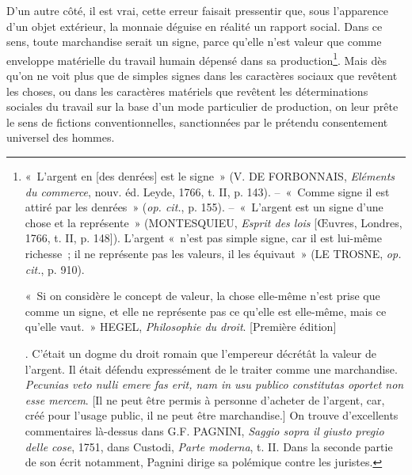 \documentclass[french,twoside]{book} %
\begin{document}
D’un autre côté, il est vrai, cette erreur faisait pressentir que, sous l’apparence d’un objet extérieur, la monnaie déguise en réalité un rapport social. Dans ce sens, toute marchandise serait un signe, parce qu’elle n’est valeur que comme enveloppe matérielle du travail humain dépensé dans sa production\footnote{ \noindent « L’argent en [des denrées] est le signe » (V. DE FORBONNAIS, \emph{Eléments du commerce}, nouv. éd. Leyde, 1766, t. II, p. 143). – « Comme signe il est attiré par les denrées » (\emph{op. cit.}, p. 155). – « L’argent est un signe d’une chose et la représente » (MONTESQUIEU, \emph{Esprit des lois} [Œuvres, Londres, 1766, t. II, p. 148]). L’argent « n’est pas simple signe, car il est lui-même richesse ; il ne représente pas les valeurs, il les équivaut » (LE TROSNE, \emph{op. cit.}, p. 910).\par
 « Si on considère le concept de valeur, la chose elle-même n’est prise que comme un signe, et elle ne représente pas ce qu’elle est elle-même, mais ce qu’elle vaut. » HEGEL, \emph{Philosophie du droit}. [Première édition]\par
 [Longtemps avant les économistes, les juristes avaient mis en vogue cette idée que l’argent n’est qu’un simple signe et que les métaux précieux n’ont qu’une valeur imaginaire. Valets et sycophantes du pouvoir royal, ils ont pendant tout le Moyen Age appuyé le droit des rois à la falsification des monnaies sur les traditions de l’Empire romain et sur le concept du rôle de l’argent tel qu’il se trouve dans les Pandectes. « Que aucun puisse ne doit faire doute, dit leur habile disciple Philippe de Valois dans un décret de 1346 (16 janvier), que à Nous et à Nostre Majesté royal, n’appartiengne seulement… le mestier, le fait, la provision et toute l’Ordenance de monoie et de faire monnoier teles monnoyes et donner tel cours, pour tel prix comme il Nous plaist et bon Nous semble » [\emph{Ordonnances des rois de France de la 3e race}…, Paris, 1729, t. II, p. 254]. C’était un dogme du droit romain que l’empereur décrétât la valeur de l’argent. Il était défendu expressément de le traiter comme une marchandise. \emph{Pecunias veto nulli emere fas erit, nam in usu publico constitutas oportet non esse mercem}. [Il ne peut être permis à personne d’acheter de l’argent, car, créé pour l’usage public, il ne peut être marchandise.] On trouve d’excellents commentaires là-dessus dans G.F. PAGNINI, \emph{Saggio sopra il giusto pregio delle cose}, 1751, dans Custodi, \emph{Parte moderna}, t. II. Dans la seconde partie de son écrit notamment, Pagnini dirige sa polémique contre les juristes.
}. Mais dès qu’on ne voit plus que de simples signes dans les caractères sociaux que revêtent les choses, ou dans les caractères matériels que revêtent les déterminations sociales du travail sur la base d’un mode particulier de production, on leur prête le sens de fictions conventionnelles, sanctionnées par le prétendu consentement universel des hommes.\par
\end{document}
